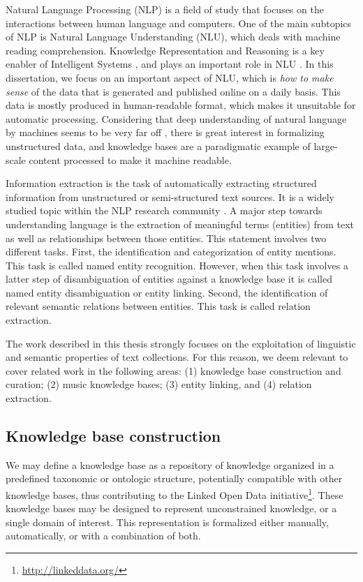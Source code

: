 Natural Language Processing (NLP) is a field of study that focuses on the interactions between human language and computers. One of the main subtopics of NLP is Natural Language Understanding (NLU), which deals with machine reading comprehension.
Knowledge Representation and Reasoning is a key enabler of Intelligent Systems \citep{Suchaneketal2007}, and plays an important role in NLU \citep{BaralandDeGiacomo2015}.
In this dissertation, we focus on an important aspect of NLU, which is \textit{how to make sense} of the data that is generated and published online on a daily basis. This data is mostly produced in human-readable format, which makes it unsuitable for automatic processing. Considering that deep understanding of natural language by machines seems to be very far off \citep{CambriaandWhite2014}, there is great interest in formalizing unstructured data, and knowledge bases are a paradigmatic example of large-scale content processed to make it machine readable.

Information extraction is the task of automatically extracting structured information from unstructured or semi-structured text sources. It is a widely studied topic within the NLP research community \citep{cowie1996information}.
A major step towards understanding language is the extraction of meaningful terms (entities) from text as well as relationships between those entities. This statement involves two different tasks. First, the identification and categorization of entity mentions. This task is called named entity recognition. However, when this task involves a latter step of disambiguation of entities against a knowledge base it is called named entity disambiguation or entity linking. Second, the identification of relevant semantic relations between entities. This task is called relation extraction.

The work described in this thesis strongly focuses on the exploitation of linguistic and semantic properties of text collections. For this reason, we deem relevant to cover related work in the following areas: (1) knowledge base construction and curation; (2) music knowledge bases; (3) entity linking, and (4) relation extraction.


\subsection{Knowledge base construction}
\label{sec:SOA:nlu:kbs}

We may define a knowledge base as a repository of knowledge organized in a predefined taxonomic or ontologic structure, potentially compatible with other knowledge bases, thus contributing to the Linked Open Data initiative\footnote{\url{http://linkeddata.org/}}. These knowledge bases may be designed to represent unconstrained knowledge, or a single domain of interest. This representation is formalized either manually, automatically, or with a combination of both.

